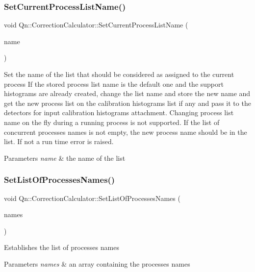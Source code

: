 \subsubsection{\texorpdfstring{Set\+Current\+Process\+List\+Name()}{SetCurrentProcessListName()}}
{\footnotesize\ttfamily void Qn\+::\+Correction\+Calculator\+::\+Set\+Current\+Process\+List\+Name (\begin{DoxyParamCaption}\item[{const char $\ast$}]{name }\end{DoxyParamCaption})}

Set the name of the list that should be considered as assigned to the current process If the stored process list name is the default one and the support histograms are already created, change the list name and store the new name and get the new process list on the calibration histograms list if any and pass it to the detectors for input calibration histograms attachment. Changing process list name on the fly during a running process is not supported. If the list of concurrent processes names is not empty, the new process name should be in the list. If not a run time error is raised. 
\begin{DoxyParams}{Parameters}
{\em name} & the name of the list \\
\hline
\end{DoxyParams}
\mbox{\label{classQn_1_1CorrectionCalculator_ac0ad939e7fbdcb80c6b2ee08fc7d3447}} 
\subsubsection{\texorpdfstring{Set\+List\+Of\+Processes\+Names()}{SetListOfProcessesNames()}}
{\footnotesize\ttfamily void Qn\+::\+Correction\+Calculator\+::\+Set\+List\+Of\+Processes\+Names (\begin{DoxyParamCaption}\item[{T\+Obj\+Array $\ast$}]{names }\end{DoxyParamCaption})\hspace{0.3cm}{\ttfamily [inline]}}

Establishes the list of processes names 
\begin{DoxyParams}{Parameters}
{\em names} & an array containing the processes names \\
\hline
\end{DoxyParams}
\mbox{\label{classQn_1_1CorrectionCalculator_a97f032c649755a11b88f919dbb02c717}} 
